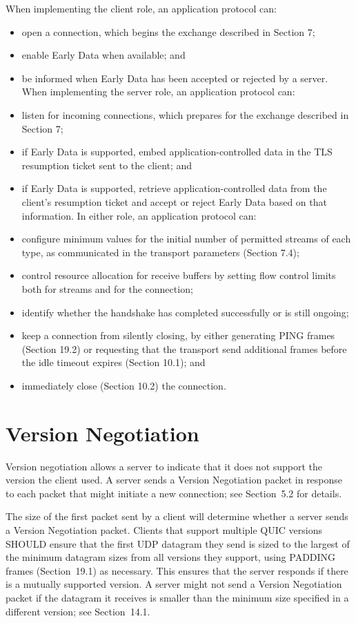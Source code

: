 \documentclass{article}
\begin{document}
When implementing the client role, an application protocol can:

\begin{itemize}
\item open a connection, which begins the exchange described in Section 7;
\item enable Early Data when available; and
\item be informed when Early Data has been accepted or rejected by a server.
When implementing the server role, an application protocol can:

\item listen for incoming connections, which prepares for the exchange described in Section 7;
\item if Early Data is supported, embed application-controlled data in the TLS resumption ticket sent to the client; and
\item if Early Data is supported, retrieve application-controlled data from the client's resumption ticket and accept or reject Early Data based on that information.
In either role, an application protocol can:

\item configure minimum values for the initial number of permitted streams of each type, as communicated in the transport parameters (Section 7.4);
\item control resource allocation for receive buffers by setting flow control limits both for streams and for the connection;
\item identify whether the handshake has completed successfully or is still ongoing;
\item keep a connection from silently closing, by either generating PING frames (Section 19.2) or requesting that the transport send additional frames before the idle timeout expires (Section 10.1); and
\item immediately close (Section 10.2) the connection.
\end{itemize}
\section{Version Negotiation}

Version negotiation allows a server to indicate that it does not support the version the client used.  A server sends a Version Negotiation packet in response to each packet that might initiate a new connection; see Section~5.2 for details.

The size of the first packet sent by a client will determine whether a server sends a Version Negotiation packet.  Clients that support multiple QUIC versions SHOULD ensure that the first UDP datagram they send is sized to the largest of the minimum datagram sizes from all versions they support, using PADDING frames (Section~19.1) as necessary.  This ensures that the server responds if there is a mutually supported version.  A server might not send a Version Negotiation packet if the datagram it receives is smaller than the minimum size specified in a different version; see Section~14.1.
\end{document}
